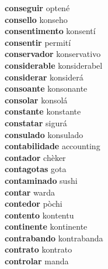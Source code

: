 \textbf{conseguir } optené \\
\textbf{consello } konseho \\
\textbf{consentimento } konsentí \\
\textbf{consentir } permití \\
\textbf{conservador } konservativo \\
\textbf{considerable } konsiderabel \\
\textbf{considerar } konsiderá \\
\textbf{consoante } konsonante \\
\textbf{consolar } konsolá \\
\textbf{constante } konstante \\
\textbf{constatar } sigurá \\
\textbf{consulado } konsulado \\
\textbf{contabilidade } accounting \\
\textbf{contador } chèker \\
\textbf{contagotas } gota \\
\textbf{contaminado } sushi \\
\textbf{contar } warda \\
\textbf{contedor } pòchi \\
\textbf{contento } kontentu \\
\textbf{continente } kontinente \\
\textbf{contrabando } kontrabanda \\
\textbf{contrato } kontrato \\
\textbf{controlar } manda \\
